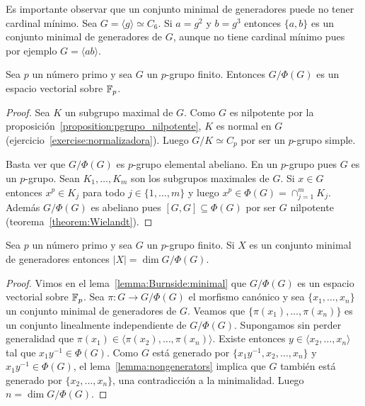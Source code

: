 \begin{remark}
	Es importante observar que un conjunto minimal de generadores puede no
	tener cardinal mínimo. Sea $G=\langle g\rangle\simeq C_6$.  Si $a=g^2$ y
	$b=g^3$ entonces $\{a,b\}$ es un conjunto minimal de generadores de $G$,
	aunque no tiene cardinal mínimo pues por ejemplo $G=\langle ab\rangle$.
\end{remark}

\begin{lemma}
	\label{lemma:Burnside:minimal}
	Sea $p$ un número primo y sea 
	$G$ un $p$-grupo finito. Entonces $G/\Phi(G)$ es un espacio vectorial
	sobre $\mathbb{F}_p$.
\end{lemma}

\begin{proof}
	Sea $K$ un subgrupo maximal de $G$. Como $G$ es nilpotente por la
	proposición~\ref{proposition:pgrupo_nilpotente}, $K$ es normal en $G$
	(ejercicio~\ref{exercise:normalizadora}). Luego $G/K\simeq C_p$ por ser un $p$-grupo
	simple. 
	
	Basta ver que $G/\Phi(G)$ es $p$-grupo elemental abeliano. En un $p$-grupo
	pues $G$ es un $p$-grupo.  Sean $K_1,\dots,K_m$ son los subgrupos maximales
	de $G$. Si $x\in G$ entonces $x^p\in K_j$ para todo $j\in\{1,\dots,m\}$ y
	luego $x^p\in\Phi(G)=\cap_{j=1}^m K_j$. Además $G/\Phi(G)$ es abeliano pues
	$[G,G]\subseteq \Phi(G)$ por ser $G$ nilpotente
	(teorema~\ref{theorem:Wielandt}). 
\end{proof}

\begin{theorem}[Burnside]
	\label{theorem:Burnside:basis}
	Sea $p$ un número primo y sea $G$ un $p$-grupo finito. Si $X$ es un
	conjunto minimal de generadores entonces $|X|=\dim G/\Phi(G)$. 
\end{theorem}


\begin{proof}
	Vimos en el lema~\ref{lemma:Burnside:minimal} que $G/\Phi(G)$ es un espacio
	vectorial sobre $\mathbb{F}_p$. Sea $\pi\colon G\to G/\Phi(G)$ el morfismo canónico
	y sea $\{x_1,\dots,x_n\}$ un conjunto minimal de generadores de $G$.
	Veamos que $\{\pi(x_1),\dots,\pi(x_n)\}$ es un conjunto linealmente
	independiente de $G/\Phi(G)$.  Supongamos sin perder generalidad que
	$\pi(x_1)\in\langle \pi(x_2),\dots,\pi(x_n)\rangle$. Existe entonces $y\in
	\langle x_2,\dots,x_n\rangle$ tal que $x_1y^{-1}\in\Phi(G)$. Como $G$ está
	generado por $\{x_1y^{-1},x_2,\dots,x_n\}$ y $x_1y^{-1}\in\Phi(G)$, el
	lema~\ref{lemma:nongenerators} implica que $G$ también está generado por
	$\{x_2,\dots,x_n\}$, una contradicción a la minimalidad. Luego $n=\dim
	G/\Phi(G)$.
\end{proof}


